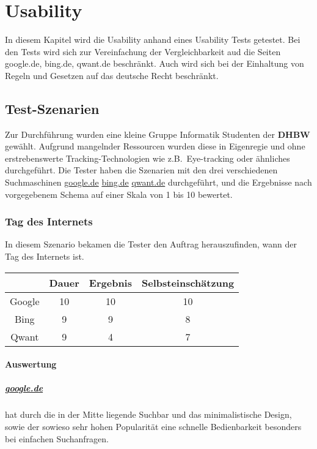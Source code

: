 \chapter{Usability}\label{ch:usability}

In diesem Kapitel wird die Usability anhand eines Usability Tests getestet.
Bei den Tests wird sich zur Vereinfachung der Vergleichbarkeit aud die Seiten google.de, bing.de, qwant.de beschränkt.
Auch wird sich bei der Einhaltung von Regeln und Gesetzen auf das deutsche Recht beschränkt.

\section{Test-Szenarien}\label{sec:szenarien}
Zur Durchführung wurden eine kleine Gruppe Informatik Studenten der \textbf{DHBW} gewählt.
Aufgrund mangelnder Ressourcen wurden diese in Eigenregie und ohne erstrebenswerte Tracking-Technologien wie z.B.\ Eye-tracking oder ähnliches durchgeführt.
Die Tester haben die Szenarien mit den drei verschiedenen Suchmaschinen \url{google.de} \url{bing.de} \url{qwant.de} durchgeführt,
und die Ergebnisse nach vorgegebenem Schema auf einer Skala von 1 bis 10 bewertet.

\subsection{Tag des Internets}\label{subsec:szenario1}
In diesem Szenario bekamen die Tester den Auftrag herauszufinden, wann der Tag des Internets ist.

\begin{tabular}{|c|c|c|c|}
    \hline
    & Dauer & Ergebnis & Selbsteinschätzung \\
    \hline
    Google & 10    & 10       & 10                 \\
    \hline
    Bing   & 9     & 9        & 8                  \\
    \hline
    Qwant  & 9     & 4        & 7                  \\
    \hline
\end{tabular}

\subsubsection*{Auswertung}
\paragraph{\url{google.de}}
hat durch die in der Mitte liegende Suchbar und das minimalistische Design,
sowie der sowieso sehr hohen Popularität eine schnelle Bedienbarkeit besonders bei einfachen Suchanfragen.\\

